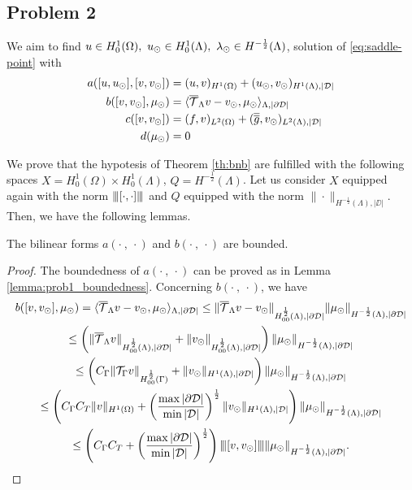 \subsection{Problem 2}
We aim to find $u \in H^1_0(\Omega),\ u_{\odot} \in H^1_0(\Lambda), \ \lambda_{\odot} \in H^{-\frac12}(\Lambda)$,
solution of \eqref{eq:saddle-point} with
\begin{align*}
a([u, u_{\odot}], [v, v_{\odot}])&= (u,v)_{H^1(\Omega)} + (u_{\odot},v_{\odot})_{H^1(\Lambda),|\mathcal{D}|}
\\
b([v, v_{\odot}], \mu_{\odot})&=  \langle  {\overline{\mathcal{T}}_\Lambda} v - v_{\odot}, \mu_{\odot} \rangle_{\Lambda, |\partial\mathcal{D}|} 
\\
c([v,v_{\odot}])&= (f,v)_{L^2(\Omega)} + (\overline{\overline{g}},v_{\odot})_{L^2(\Lambda),|\mathcal{D}|}
\\
d(\mu_{\odot})&=0
\end{align*}

We prove that the hypotesis of  Theorem \ref{th:bnb} are fulfilled with the following spaces $X=H^1_0(\Omega) \times H^1_0(\Lambda)$, $Q=H^{-\frac 12}(\Lambda)$.
Let us consider $X$ equipped again with the norm ${\left\vert\kern-0.25ex\left\vert\kern-0.25ex\left\vert [\cdot,\cdot ] \right\vert\kern-0.25ex\right\vert\kern-0.25ex\right\vert}$ and  
$Q$ equipped with the norm $\|\cdot \|_{H^{-\frac 12}(\Lambda),|\DD|}$.
Then, we have the following lemmas.
\begin{lemma}
The bilinear forms $a(\cdot \ , \ \cdot)$ and $b(\cdot \ , \ \cdot)$ are bounded.
\end{lemma}
\begin{proof}
The boundedness of $a(\cdot \ , \ \cdot)$ can be proved as in Lemma \ref{lemma:prob1_boundedness}. Concerning $b(\cdot \ , \ \cdot)$, we have
\begin{multline*}
b([v, v_{\odot}], \mu_{\odot})=  \langle  {\overline{\mathcal{T}}_\Lambda} v - v_{\odot}, \mu_{\odot} \rangle_{\Lambda, |\partial\mathcal{D}|} 
\leq \|{\overline{\mathcal{T}}_\Lambda} v - v_{\odot}\|_{H^{\frac 12 }_{00}(\Lambda), |\partial\mathcal{D}|}\|\mu_{\odot}\|_{H^{-\frac 12}(\Lambda),|\partial\mathcal{D}|}\\
\leq \left(\|{\overline{\mathcal{T}}_\Lambda} v\|_{H^{\frac 12 }_{00}(\Lambda), |\partial\mathcal{D}|}+\|v_{\odot}\|_{H^{\frac 12 }_{00}(\Lambda), |\partial\mathcal{D}|}\right)\|\mu_{\odot}\|_{H^{-\frac 12}(\Lambda),|\partial\mathcal{D}|}\\
\leq \left(C_\Gamma \|{\mathcal{T}_\Gamma} v\|_{H^{\frac 12 }_{00}(\Gamma)}+ \|v_{\odot}\|_{H^1(\Lambda), |\partial\mathcal{D}|}\right)\|\mu_{\odot}\|_{H^{-\frac 12}(\Lambda),|\partial\mathcal{D}|} \\
\leq \left(C_\Gamma C_T\|v\|_{H^1(\Omega)}+ \left(\frac{\max |\partial\mathcal{D}|}{\min |\mathcal{D}|}\right)^{\frac 12} \|v_{\odot}\|_{H^1(\Lambda), |\mathcal{D}|}\right) \|\mu_{\odot}\|_{H^{-\frac 12}(\Lambda),|\partial\mathcal{D}|} \\
\leq  \left( C_\Gamma C_T + \left(\frac{\max |\partial\mathcal{D}|}{\min |\mathcal{D}|}\right)^{\frac 12} \right) {\left\vert\kern-0.25ex\left\vert\kern-0.25ex\left\vert [v,v_{\odot}] \right\vert\kern-0.25ex\right\vert\kern-0.25ex\right\vert}\|\mu_{\odot}\|_{H^{-\frac 12}(\Lambda),|\partial\mathcal{D}|}.
\end{multline*} 
\end{proof}


